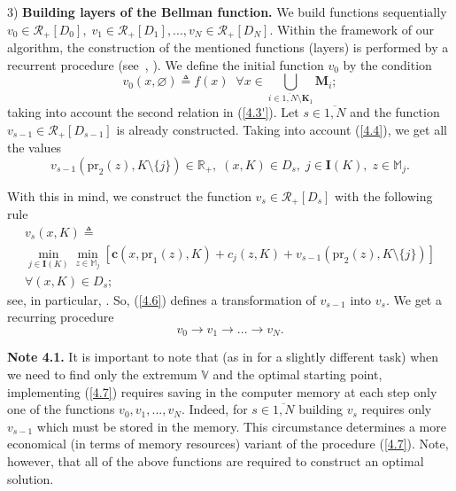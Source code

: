 \documentclass[numbers,sort&compress]{IntechOpen-Book}%
\begin{document}
3) {\bf Building layers of the Bellman function.}
We build functions sequentially
$v_0 \in \mathcal{R}_+[D_0],\;v_1 \in \mathcal{R}_+[D_1],...,v_N \in \mathcal{R}_+[D_N]$.
Within the framework of our algorithm, the construction of the mentioned functions
(layers)
is performed by a recurrent procedure
(see~\cite[$\S$4.9]{14}, \cite{18}).
We define
the initial
function $ v_0 $ by the condition
\begin{equation}\label{4.5}
  v_0(x,\varnothing) {\triangleq} f(x)\;\;
  \forall{x} \in \bigcup\limits_{i \in \overline{1,N} \setminus \mathbf{K}_1} \mathbf{\mathbf{M}}_i;
\end{equation}
taking into account the second relation in (\ref{4.3'}).
Let $s \in \overline{1,N}$
and the function
$v_{s-1} \in \mathcal{R}_+[D_{s-1}]$
is already constructed.
Taking into account
 (\ref{4.4}),
we get all the values
$$
  v_{s-1}(\mathrm{pr}_2(z),K \setminus \{j\}) \in \mathbb{R}_+,\;
  (x,K) \in D_s,\;j \in \mathbf{I}(K),\;z \in \mathbb{M}_j.
$$

With this in mind,
we construct the function
$v_s \in \mathcal{R}_+[D_s]$
with the following rule
\begin{multline}
  \label{4.6}
  v_s(x,K) {\triangleq} \\
  \min\limits_{j \in \mathbf{I}(K)} \min\limits_{z \in \mathbb{M}_j}
  [\mathbf{c}(x,\mathrm{pr}_1(z),K) + c_j(z,K) + v_{s-1}(\mathrm{pr}_2(z),K \setminus \{j\})] \\
  \forall{(x,K)} \in D_s;
\end{multline}
see, in particular,
\cite[(4.3.13)]{4}.
So, (\ref{4.6})
defines a transformation of
$v_{s-1}$ into $v_s.$
We get a recurring procedure
\begin{equation}\label{4.7}
  v_0 \longrightarrow v_1 \longrightarrow ... \longrightarrow v_N.
\end{equation}

{\bf Note 4.1.}
It is important to note that
(as in \cite {22} for a slightly different task)
when we need to find
only the extremum
$ \mathbb V $
and the optimal starting point,
implementing (\ref{4.7})
requires saving in the computer memory
at each step
only one of the functions
$v_0,v_1,...,v_N$.
Indeed,
for
$s \in \overline{1,N}$
building $v_s$
requires only $v_{s-1}$
which must be stored in the memory.
This circumstance determines a more economical
(in terms of memory resources)
variant of the procedure (\ref{4.7}).
Note, however,
that all of the above functions are required to construct an optimal solution.
\end{document}

